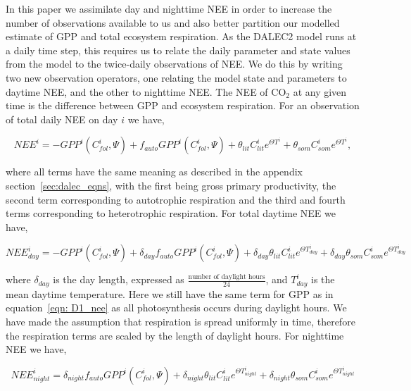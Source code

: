 \documentclass[draft,linenumbers]{agujournal}
\begin{document}
In this paper we assimilate day and nighttime NEE in order to increase the number of observations available to us and also better partition our modelled estimate of GPP and total ecosystem respiration. As the DALEC2 model runs at a daily time step, this requires us to relate the daily parameter and state values from the model to the twice-daily observations of NEE. We do this by writing two new observation operators, one relating the model state and parameters to daytime NEE, and the other to nighttime NEE. The NEE of CO\(_{2}\) at any given time is the difference between GPP and ecosystem respiration. For an observation of total daily NEE on day \(i\) we have,
\begin{linenomath*}
\begin{equation}
NEE^{i}=-GPP^{i}(C_{fol}^{i}, \Psi) +f_{auto}GPP^{i}(C_{fol}^{i}, \Psi) + \theta_{lit}C_{lit}^i e^{\Theta T^{i}} + \theta_{som}C_{som}^i e^{\Theta T^{i}}, \label{eqn: D1_nee}
\end{equation}
\end{linenomath*}
where all terms have the same meaning as described in the appendix section~\ref{sec:dalec_eqns}, with the first being gross primary productivity, the second term corresponding to autotrophic respiration and the third and fourth terms corresponding to heterotrophic respiration. For total daytime NEE we have,
\begin{linenomath*}
\begin{equation}
NEE_{day}^{i} = -GPP^{i}(C_{fol}^{i}, \Psi) + \delta_{day}f_{auto}GPP^{i}(C_{fol}^{i}, \Psi) + \delta_{day}\theta_{lit}C_{lit}^i e^{\Theta T_{day}^{i}} + \delta_{day}\theta_{som}C_{som}^i e^{\Theta T_{day}^{i}} \label{eqn: D1_nee_day}
\end{equation}
\end{linenomath*}
where \(\delta_{day}\) is the day length, expressed as \(\frac{\text{number of daylight hours}}{24}\), and \(T_{day}^{i}\) is the mean daytime temperature. Here we still have the same term for GPP as in equation~\eqref{eqn: D1_nee} as all photosynthesis occurs during daylight hours. We have made the assumption that respiration is spread uniformly in time, therefore the respiration terms are scaled by the length of daylight hours. For nighttime NEE we have,
\begin{linenomath*}
\begin{equation}
NEE_{night}^{i} =  \delta_{night}f_{auto}GPP^{i}(C_{fol}^{i}, \Psi) + \delta_{night}\theta_{lit}C_{lit}^i e^{\Theta T_{night}^{i}} + \delta_{night}\theta_{som}C_{som}^i e^{\Theta T_{night}^{i}} \label{eqn: D1_nee_night}
\end{equation}
\end{linenomath*}
\end{document}
